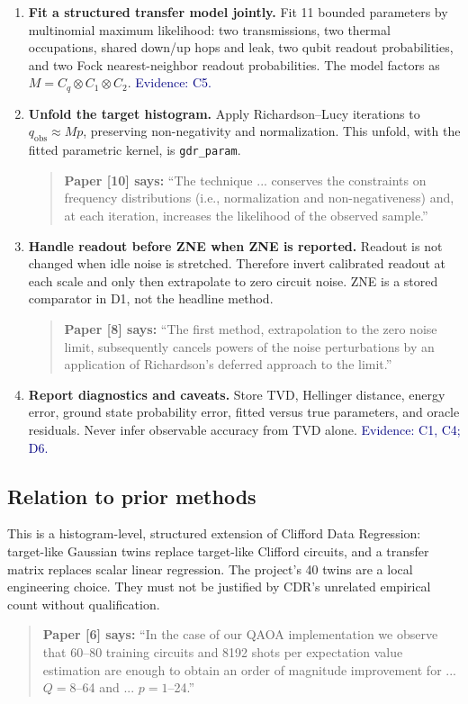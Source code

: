 \documentclass[10pt]{article}
\newcommand{\code}[1]{\texttt{#1}}
\newcommand{\evidence}[1]{\textcolor{navy}{\footnotesize\textsf{Evidence: #1}}}
\newcommand{\paperquote}[2]{%
  \begin{quote}\small\textbf{Paper [#1] says:} ``#2''\end{quote}}
\begin{document}
\begin{enumerate}[label=\textbf{Step \arabic*.},leftmargin=3.6em,itemsep=5pt]
\item \textbf{Fit a structured transfer model jointly.} Fit 11 bounded parameters by multinomial
maximum likelihood: two transmissions, two thermal occupations, shared down/up hops and leak, two
qubit readout probabilities, and two Fock nearest-neighbor readout probabilities. The model factors
as $M=C_q\otimes C_1\otimes C_2$. \evidence{C5.}

\item \textbf{Unfold the target histogram.} Apply Richardson--Lucy iterations to
$q_{\mathrm{obs}}\approx Mp$, preserving non-negativity and normalization.
This unfold, with the fitted parametric kernel, is \code{gdr\_param}.
\paperquote{10}{The technique ... conserves the constraints on frequency distributions
(i.e., normalization and non-negativeness) and, at each iteration, increases the likelihood of the
observed sample.}

\item \textbf{Handle readout before ZNE when ZNE is reported.} Readout is not changed when idle
noise is stretched. Therefore invert calibrated readout at each scale and only then extrapolate
to zero circuit noise. ZNE is a stored comparator in D1, not the headline method.
\paperquote{8}{The first method, extrapolation to the zero noise limit, subsequently cancels powers
of the noise perturbations by an application of Richardson's deferred approach to the limit.}

\item \textbf{Report diagnostics and caveats.} Store TVD, Hellinger distance, energy error, ground
state probability error, fitted versus true parameters, and oracle residuals. Never infer observable
accuracy from TVD alone. \evidence{C1, C4; D6.}
\end{enumerate}

\subsection{Relation to prior methods}

This is a histogram-level, structured extension of Clifford Data Regression: target-like Gaussian
twins replace target-like Clifford circuits, and a transfer matrix replaces scalar linear
regression. The project's 40 twins are a local engineering choice. They must not be justified by
CDR's unrelated empirical count without qualification.

\paperquote{6}{In the case of our QAOA implementation we observe that 60--80 training circuits and
8192 shots per expectation value estimation are enough to obtain an order of magnitude improvement
for ... \(Q=8\)--64 and ... \(p=1\)--24.}
\end{document}
